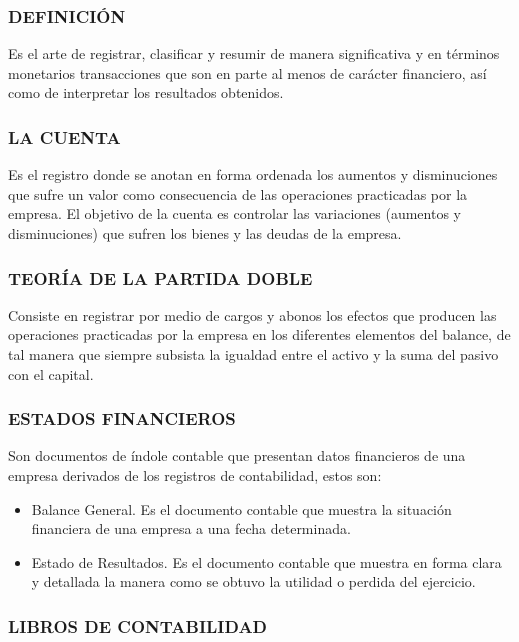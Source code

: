 \subsubsection*{DEFINICIÓN}
Es el arte de registrar, clasificar y resumir de manera significativa y en términos monetarios transacciones que son en parte al menos de carácter financiero, así como de interpretar los resultados obtenidos.

\subsubsection*{LA CUENTA}
Es el registro donde se anotan en forma ordenada los aumentos y disminuciones que sufre un valor como consecuencia de las operaciones practicadas por la empresa. El objetivo de la cuenta es controlar las variaciones (aumentos y disminuciones) que sufren los bienes y las deudas de la empresa.

\subsubsection*{TEORÍA DE LA PARTIDA DOBLE}
Consiste en registrar por medio de cargos y abonos los efectos que producen las operaciones practicadas por la empresa en los diferentes elementos del balance, de tal manera que siempre subsista la igualdad entre el activo y la suma del pasivo con el capital.

\subsubsection*{ESTADOS FINANCIEROS}
Son documentos de índole contable que presentan datos financieros de una empresa derivados de los registros de contabilidad, estos son:

\begin{itemize}
  \item Balance General. Es el documento contable que muestra la situación financiera de una empresa a una fecha determinada.
  \item Estado de Resultados. Es el documento contable que muestra en forma clara y detallada la manera como se obtuvo la utilidad o perdida del ejercicio.
\end{itemize}
\subsubsection*{LIBROS DE CONTABILIDAD}


